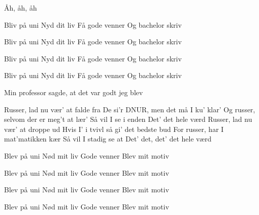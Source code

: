 \documentclass[a4paper,11pt]{article}
\begin{document}
\begin{song}
 Åh, åh, åh

 Bliv på uni
Nyd dit liv
Få gode venner
Og bachelor skriv

 Bliv på uni
Nyd dit liv
Få gode venner
Og bachelor skriv

Bliv på uni
Nyd dit liv
Få gode venner
Og bachelor skriv

Bliv på uni
Nyd dit liv
Få gode venner
Og bachelor skriv

 Min professor sagde, at det var godt jeg blev

 Russer, lad nu vær' at falde fra
De si'r DNUR, men det må I ku' klar'
Og russer, selvom der er meg't at lær'
Så vil I se i enden
Det' det hele værd
Russer, lad nu vær' at droppe ud
Hvis I' i tvivl så gi' det bedste bud
For russer, har I mat'matikken kær
Så vil I stadig se at
Det' det, det' det hele værd

 Blev på uni
Nød mit liv
Gode venner
Blev mit motiv

Blev på uni
Nød mit liv
Gode venner
Blev mit motiv

Blev på uni
Nød mit liv
Gode venner
Blev mit motiv

Blev på uni
Nød mit liv
Gode venner
Blev mit motiv
\end{song}
\end{document}

